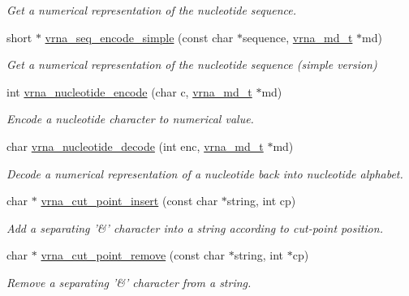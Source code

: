 \begin{DoxyCompactItemize}
\begin{DoxyCompactList}\small\item\em Get a numerical representation of the nucleotide sequence. \end{DoxyCompactList}\item 
\hypertarget{group__string__utils_ga3cd79d21d53248ad2634c1c0d43e97d7}{short $\ast$ \hyperlink{group__string__utils_ga3cd79d21d53248ad2634c1c0d43e97d7}{vrna\-\_\-seq\-\_\-encode\-\_\-simple} (const char $\ast$sequence, \hyperlink{group__model__details_ga1f8a10e12a0a1915f2a4eff0b28ea17c}{vrna\-\_\-md\-\_\-t} $\ast$md)}\label{group__string__utils_ga3cd79d21d53248ad2634c1c0d43e97d7}

\begin{DoxyCompactList}\small\item\em Get a numerical representation of the nucleotide sequence (simple version) \end{DoxyCompactList}\item 
int \hyperlink{group__string__utils_gac12bf00123f88621c9be847b0879c1fb}{vrna\-\_\-nucleotide\-\_\-encode} (char c, \hyperlink{group__model__details_ga1f8a10e12a0a1915f2a4eff0b28ea17c}{vrna\-\_\-md\-\_\-t} $\ast$md)
\begin{DoxyCompactList}\small\item\em Encode a nucleotide character to numerical value. \end{DoxyCompactList}\item 
char \hyperlink{group__string__utils_ga48ef585e697be9c8a08ed68c655e29b6}{vrna\-\_\-nucleotide\-\_\-decode} (int enc, \hyperlink{group__model__details_ga1f8a10e12a0a1915f2a4eff0b28ea17c}{vrna\-\_\-md\-\_\-t} $\ast$md)
\begin{DoxyCompactList}\small\item\em Decode a numerical representation of a nucleotide back into nucleotide alphabet. \end{DoxyCompactList}\item 
char $\ast$ \hyperlink{group__string__utils_ga74f05ece32ea73b59f84a7452afd5fae}{vrna\-\_\-cut\-\_\-point\-\_\-insert} (const char $\ast$string, int cp)
\begin{DoxyCompactList}\small\item\em Add a separating '\&' character into a string according to cut-\/point position. \end{DoxyCompactList}\item 
char $\ast$ \hyperlink{group__string__utils_ga1fbd821d4408cc5f1dd9d12c15e092cb}{vrna\-\_\-cut\-\_\-point\-\_\-remove} (const char $\ast$string, int $\ast$cp)
\begin{DoxyCompactList}\small\item\em Remove a separating '\&' character from a string. \end{DoxyCompactList}\end{DoxyCompactItemize}


